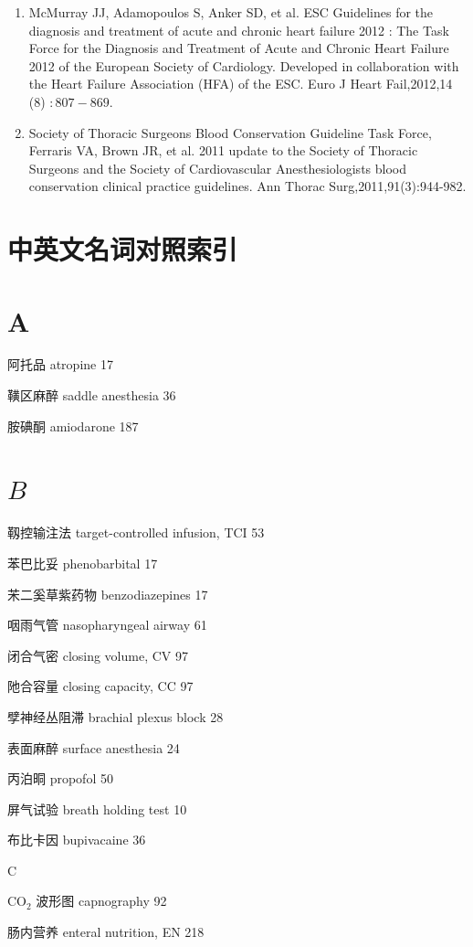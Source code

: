 \documentclass[10pt]{article}
\begin{document}
\begin{enumerate}
  \item McMurray JJ, Adamopoulos S, Anker SD, et al. ESC Guidelines for the diagnosis and treatment of acute and chronic heart failure 2012 : The Task Force for the Diagnosis and Treatment of Acute and Chronic Heart Failure 2012 of the European Society of Cardiology. Developed in collaboration with the Heart Failure Association (HFA) of the ESC. Euro J Heart Fail,2012,14 (8) $: 807-869$.

  \item Society of Thoracic Surgeons Blood Conservation Guideline Task Force, Ferraris VA, Brown JR, et al. 2011 update to the Society of Thoracic Surgeons and the Society of Cardiovascular Anesthesiologists blood conservation clinical practice guidelines. Ann Thorac Surg,2011,91(3):944-982.

\end{enumerate}

\section*{中英文名词对照索引}
\section*{A}
阿托品 atropine 17

䪄区麻醉 saddle anesthesia 36

胺碘酮 amiodarone 187

\section*{$B$}
靱控输注法 target-controlled infusion, TCI 53

苯巴比妥 phenobarbital 17

㭉二奚草紫药物 benzodiazepines 17

咽雨气管 nasopharyngeal airway 61

闭合气密 closing volume, CV 97

阤合容量 closing capacity, CC 97

孹神经丛阻滞 brachial plexus block 28

表面麻醉 surface anesthesia 24

丙泊晍 propofol 50

屏气试验 breath holding test 10

布比卡因 bupivacaine 36

C

$\mathrm{CO}_{2}$ 波形图 capnography 92

肠内营养 enteral nutrition, EN 218
\end{document}

